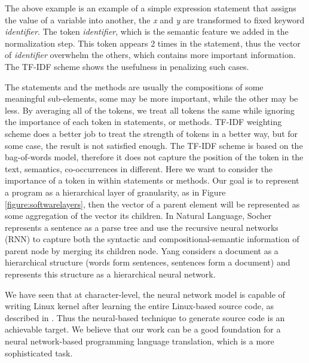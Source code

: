 The above example is an example of a simple expression statement that assigns the value of a variable into another, the \textit{x} and \textit{y} are transformed to fixed keyword \textit{identifier}. The token \textit{identifier}, which is the semantic feature we added in the normalization step. This token appears 2 times in the statement, thus the vector of \textit{identifier} overwhelm the others, which contains more important information. The TF-IDF scheme shows the usefulness in penalizing such cases.

The statements and the methods are usually the compositions of some meaningful sub-elements, some may be more important, while the other may be less. By averaging all of the tokens, we treat all tokens the same while ignoring the importance of each token in statements, or methods. TF-IDF weighting scheme does a better job to treat the strength of tokens in a better way, but for some case, the result is not satisfied enough. The TF-IDF scheme is based on the bag-of-words model, therefore it does not capture the position of the token in the text, semantics, co-occurrences in different. Here we want to consider the importance of a token in within statements or methods. Our goal is to represent a program as a hierarchical layer of granularity, as in Figure \ref{figure:softwarelayers}, then the vector of a parent element will be represented as some aggregation of the vector its children. In Natural Language, Socher \cite{socher2011parsing} represents a sentence as a parse tree and use the recursive neural networks (RNN) to capture both the syntactic and compositional-semantic information of parent node by merging its children node. Yang \cite{yang2016hierarchical} considers a document as a hierarchical structure (words form sentences, sentences form a document) and represents this structure as a hierarchical neural network.



We have seen that at character-level, the neural network model is capable of writing Linux kernel after learning the entire Linux-based source code, as described in \cite{Karpathy}. Thus the neural-based technique to generate source code is an achievable target. We believe that our work can be a good foundation for a neural network-based programming language translation, which is a more sophisticated task. 

